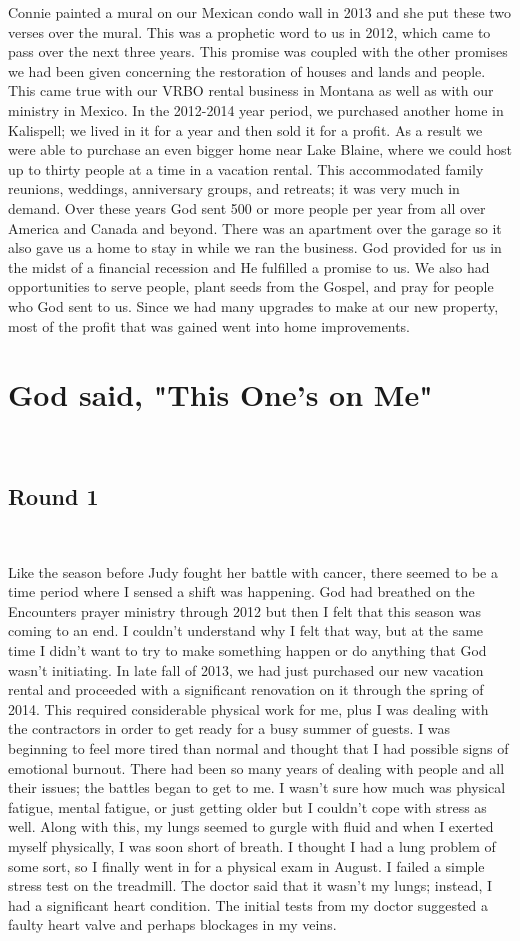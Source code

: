 \documentclass[oneside]{book}
\begin{document}
Connie painted a mural on our Mexican condo wall in 2013 and she put these two verses over the mural. This was a prophetic word to us in 2012, which came to pass over the next three years. This promise was coupled with the other promises we had been given concerning the restoration of houses and lands and people. This came true with our VRBO rental business in Montana as well as with our ministry in Mexico. In the 2012-2014 year period, we purchased another home in Kalispell; we lived in it for a year and then sold it for a profit. As a result we were able to purchase an even bigger home near Lake Blaine, where we could host up to thirty people at a time in a vacation rental. This accommodated family reunions, weddings, anniversary groups, and retreats; it was very much in demand. Over these years God sent 500 or more people per year from all over America and Canada and beyond. There was an apartment over the garage so it also gave us a home to stay in while we ran the business. God provided for us in the midst of a financial recession and He fulfilled a promise to us. We also had opportunities to serve people, plant seeds from the Gospel, and pray for people who God sent to us. Since we had many upgrades to make at our new property, most of the profit that was gained went into home improvements. 


\chapter{God said, "This One's on Me"}
\

\section*{Round 1}
\

Like the season before Judy fought her battle with cancer, there seemed to be a time period where I sensed a shift was happening. God had breathed on the Encounters prayer ministry through 2012 but then I felt that this season was coming to an end. I couldn't understand why I felt that way, but at the same time I didn't want to try to make something happen or do anything that God wasn't initiating. In late fall of 2013, we had just purchased our new vacation rental and proceeded with a significant renovation on it through the spring of 2014. This required considerable physical work for me, plus I was dealing with the contractors in order to get ready for a busy summer of guests. I was beginning to feel more tired than normal and thought that I had possible signs of emotional burnout. There had been so many years of dealing with people and all their issues; the battles began to get to me. I wasn't sure how much was physical fatigue, mental fatigue, or just getting older but I couldn't cope with stress as well. Along with this, my lungs seemed to gurgle with fluid and when I exerted myself physically, I was soon short of breath. I thought I had a lung problem of some sort, so I finally went in for a physical exam in August. I failed a simple stress test on the treadmill. The doctor said that it wasn't my lungs; instead, I had a significant heart condition. The initial tests from my doctor suggested a faulty heart valve and perhaps blockages in my veins. 
\end{document}
